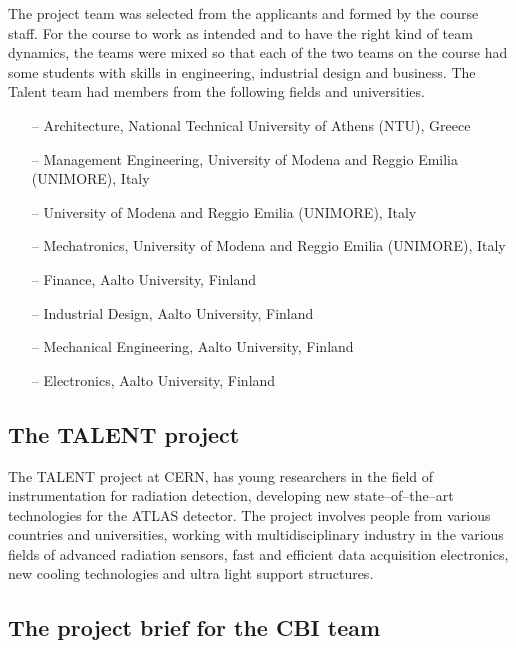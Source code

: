 \documentclass[english,12pt,a4paper,dvips]{article}
\begin{document}
The project team was selected from the applicants and formed by the course staff. For the course to work as intended and to have the right kind of team dynamics, the teams were mixed so that each of the two teams on the course had some students with skills in engineering, industrial design and business. The Talent team had members from the following fields and universities.

\begin{itemize}
\item[--] Architecture, National Technical University of Athens (NTU), Greece
\item[--] Management Engineering, University of Modena and Reggio Emilia (UNIMORE), Italy
\item[--] University of Modena and Reggio Emilia (UNIMORE), Italy
\item[--] Mechatronics, University of Modena and Reggio Emilia (UNIMORE), Italy
\item[--] Finance, Aalto University, Finland
\item[--] Industrial Design, Aalto University, Finland
\item[--] Mechanical Engineering, Aalto University, Finland
\item[--] Electronics, Aalto University, Finland
\end{itemize}

\subsection{The TALENT project}

The TALENT project at CERN, has young researchers in the field of instrumentation for radiation detection, developing new state--of--the--art technologies for the ATLAS detector. The project involves people from various countries and universities, working with multidisciplinary industry in the various fields of advanced radiation sensors, fast and efficient data acquisition electronics, new cooling technologies and ultra light support structures.



\subsection{The project brief for the CBI team}
\end{document}
